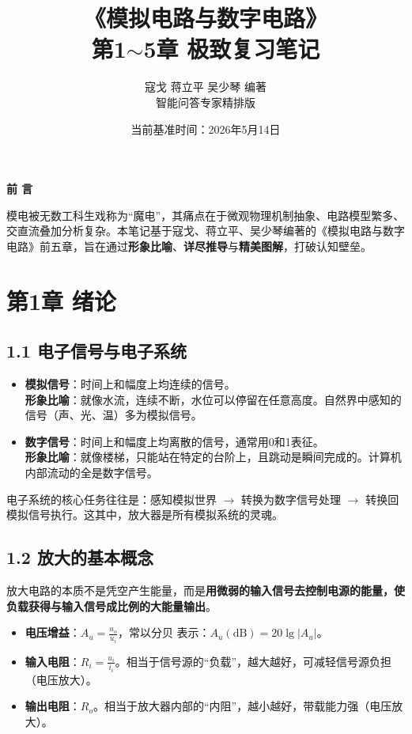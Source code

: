 \documentclass[12pt,a4paper]{ctexart}
\title{\textbf{《模拟电路与数字电路》\\ 第1$\sim$5章 极致复习笔记}}
\author{寇戈 \quad 蒋立平 \quad 吴少琴 \quad 编著\\ \small 智能问答专家精排版}
\date{当前基准时间：2026年5月14日}
\begin{document}
	\maketitle
	\thispagestyle{empty}
	\begin{center}
		\vspace{2cm}
		\Large\textbf{前 言}
	\end{center}
	模电被无数工科生戏称为“魔电”，其痛点在于微观物理机制抽象、电路模型繁多、交直流叠加分析复杂。本笔记基于寇戈、蒋立平、吴少琴编著的《模拟电路与数字电路》前五章，旨在通过\textbf{形象比喻}、\textbf{详尽推导}与\textbf{精美图解}，打破认知壁垒。
	\clearpage
	\tableofcontents
	\clearpage
	\section*{第1章 绪论}
	\subsection*{1.1 电子信号与电子系统}
	\begin{notebox}
		\begin{itemize}[leftmargin=2em]
			\item \textbf{模拟信号}：时间上和幅度上均连续的信号。\\
			\textbf{形象比喻}：就像水流，连续不断，水位可以停留在任意高度。自然界中感知的信号（声、光、温）多为模拟信号。
			\item \textbf{数字信号}：时间上和幅度上均离散的信号，通常用0和1表征。\\
			\textbf{形象比喻}：就像楼梯，只能站在特定的台阶上，且跳动是瞬间完成的。计算机内部流动的全是数字信号。
		\end{itemize}
	\end{notebox}
	电子系统的核心任务往往是：感知模拟世界 $\to$ 转换为数字信号处理 $\to$ 转换回模拟信号执行。这其中，放大器是所有模拟系统的灵魂。
	\subsection*{1.2 放大的基本概念}
	放大电路的本质不是凭空产生能量，而是\textbf{用微弱的输入信号去控制电源的能量，使负载获得与输入信号成比例的大能量输出}。
	\begin{itemize}
		\item \textbf{电压增益}：$A_u = \frac{u_o}{u_i}$，常以分贝 表示：$A_u(\text{dB}) = 20\lg|A_u|$。
		\item \textbf{输入电阻}：$R_i = \frac{u_i}{i_i}$。相当于信号源的“负载”，越大越好，可减轻信号源负担（电压放大）。
		\item \textbf{输出电阻}：$R_o$。相当于放大器内部的“内阻”，越小越好，带载能力强（电压放大）。
	\end{itemize}
	\clearpage
\end{document}
